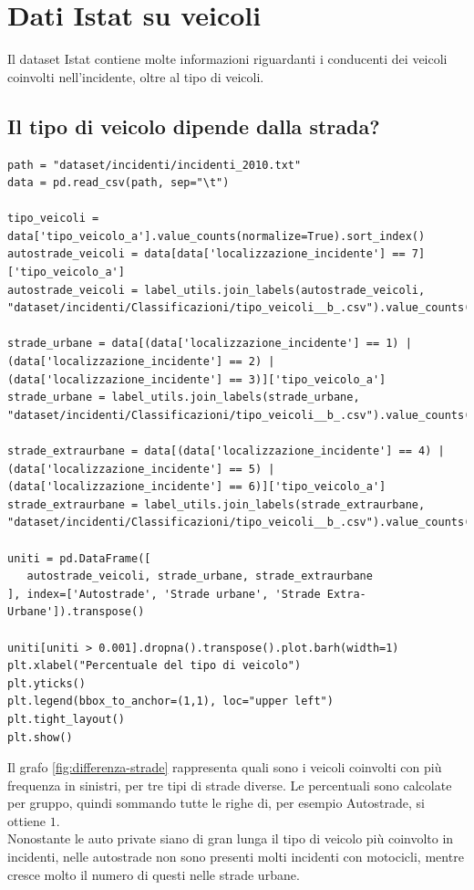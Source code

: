 \documentclass[a4paper]{report}
\begin{document}
\section{Dati Istat su veicoli}

Il dataset Istat contiene molte informazioni riguardanti i conducenti dei veicoli coinvolti 
nell'incidente, oltre al tipo di veicoli.

\subsection{Il tipo di veicolo dipende dalla strada?}

\begin{lstlisting}
path = "dataset/incidenti/incidenti_2010.txt"
data = pd.read_csv(path, sep="\t")

tipo_veicoli = data['tipo_veicolo_a'].value_counts(normalize=True).sort_index()
autostrade_veicoli = data[data['localizzazione_incidente'] == 7]['tipo_veicolo_a']
autostrade_veicoli = label_utils.join_labels(autostrade_veicoli, "dataset/incidenti/Classificazioni/tipo_veicoli__b_.csv").value_counts(normalize=True).sort_index()

strade_urbane = data[(data['localizzazione_incidente'] == 1) | (data['localizzazione_incidente'] == 2) | (data['localizzazione_incidente'] == 3)]['tipo_veicolo_a']
strade_urbane = label_utils.join_labels(strade_urbane, "dataset/incidenti/Classificazioni/tipo_veicoli__b_.csv").value_counts(normalize=True).sort_index()

strade_extraurbane = data[(data['localizzazione_incidente'] == 4) | (data['localizzazione_incidente'] == 5) | (data['localizzazione_incidente'] == 6)]['tipo_veicolo_a']
strade_extraurbane = label_utils.join_labels(strade_extraurbane, "dataset/incidenti/Classificazioni/tipo_veicoli__b_.csv").value_counts(normalize=True).sort_index()

uniti = pd.DataFrame([
   autostrade_veicoli, strade_urbane, strade_extraurbane
], index=['Autostrade', 'Strade urbane', 'Strade Extra-Urbane']).transpose()

uniti[uniti > 0.001].dropna().transpose().plot.barh(width=1)
plt.xlabel("Percentuale del tipo di veicolo")
plt.yticks()
plt.legend(bbox_to_anchor=(1,1), loc="upper left")
plt.tight_layout()
plt.show()
\end{lstlisting}

Il grafo \ref{fig:differenza-strade} rappresenta quali sono i veicoli coinvolti con più frequenza 
in sinistri, per tre tipi di strade diverse. Le percentuali sono calcolate per gruppo, quindi sommando 
tutte le righe di, per esempio Autostrade, si ottiene $1$.\\
Nonostante le auto private siano di gran lunga il tipo di veicolo 
più coinvolto in incidenti, nelle autostrade non sono presenti molti incidenti con motocicli, 
mentre cresce molto il numero di questi nelle strade urbane.
\end{document}
